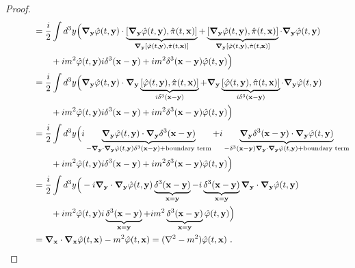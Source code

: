\begin{proof}
\begin{equation*}
\begin{aligned}
            \phantom{\pdv{}{t} \hat \pi (x)} & = \frac{i}{2} \int d^3 y \Big (\boldsymbol \nabla_{\mathbf y} \hat \varphi (t, \mathbf y) \cdot \underbrace{[\boldsymbol \nabla_{\mathbf y} \hat \varphi (t, \mathbf y), \hat \pi (t, \mathbf x)]}_{\boldsymbol \nabla_{\mathbf y} [\hat \varphi (t, \mathbf y), \hat \pi (t, \mathbf x)]} + \underbrace{[\boldsymbol \nabla_{\mathbf y} \hat \varphi (t, \mathbf y), \hat \pi (t, \mathbf x)]}_{\boldsymbol \nabla_{\mathbf y} [\hat \varphi (t, \mathbf y), \hat \pi (t, \mathbf x)]} \cdot \boldsymbol \nabla_{\mathbf y} \hat \varphi (t, \mathbf y) \\ & \qquad + i m^2 \hat \varphi (t, \mathbf y) i \delta^3 (\mathbf x - \mathbf y) + i m^2 \delta^3 (\mathbf x - \mathbf y) \hat \varphi (t, \mathbf y) \Big ) \\ & = \frac{i}{2} \int d^3 y \Big (\boldsymbol \nabla_{\mathbf y} \hat \varphi (t, \mathbf y) \cdot \boldsymbol \nabla_{\mathbf y} \underbrace{[\hat \varphi (t, \mathbf y), \hat \pi (t, \mathbf x)]}_{i \delta^3 (\mathbf x - \mathbf y)} + \boldsymbol \nabla_{\mathbf y} \underbrace{[\hat \varphi (t, \mathbf y), \hat \pi (t, \mathbf x)]}_{i \delta^3 (\mathbf x - \mathbf y)} \cdot \boldsymbol \nabla_{\mathbf y} \hat \varphi (t, \mathbf y) \\ & \qquad + i m^2 \hat \varphi (t, \mathbf y) i \delta^3 (\mathbf x - \mathbf y) + i m^2 \delta^3 (\mathbf x - \mathbf y) \hat \varphi (t, \mathbf y) \Big ) \\ & = \frac{i}{2} \int d^3 y \Big (i \underbrace{\boldsymbol \nabla_{\mathbf y} \hat \varphi (t, \mathbf y) \cdot \boldsymbol \nabla_{\mathbf y} \delta^3 (\mathbf x - \mathbf y)}_{- \boldsymbol \nabla_{\mathbf y} \cdot \boldsymbol \nabla_{\mathbf y} \hat \varphi (t, \mathbf y) \delta^3 (\mathbf x - \mathbf y) + \textnormal{boundary term}} + i \underbrace{\boldsymbol \nabla_{\mathbf y} \delta^3 (\mathbf x - \mathbf y) \cdot \boldsymbol \nabla_{\mathbf y} \hat \varphi (t, \mathbf y)}_{- \delta^3 (\mathbf x - \mathbf y) \boldsymbol \nabla_{\mathbf y} \cdot \boldsymbol \nabla_{\mathbf y} \hat \varphi (t, \mathbf y) + \textnormal{boundary term}} \\ & \qquad + i m^2 \hat \varphi (t, \mathbf y) i \delta^3 (\mathbf x - \mathbf y) + i m^2 \delta^3 (\mathbf x - \mathbf y) \hat \varphi (t, \mathbf y) \Big ) \\ & = \frac{i}{2} \int d^3 y \Big (- i \boldsymbol \nabla_{\mathbf y} \cdot \boldsymbol \nabla_{\mathbf y} \hat \varphi (t, \mathbf y) \underbrace{\delta^3 (\mathbf x - \mathbf y) }_{\mathbf x = \mathbf y} - i \underbrace{\delta^3 (\mathbf x - \mathbf y) }_{\mathbf x = \mathbf y} \boldsymbol \nabla_{\mathbf y} \cdot \boldsymbol \nabla_{\mathbf y} \hat \varphi (t, \mathbf y) \\ & \qquad + i m^2 \hat \varphi (t, \mathbf y) i \underbrace{\delta^3 (\mathbf x - \mathbf y) }_{\mathbf x = \mathbf y} + i m^2 \underbrace{\delta^3 (\mathbf x - \mathbf y) }_{\mathbf x = \mathbf y} \hat \varphi (t, \mathbf y) \Big ) \\ & = \boldsymbol \nabla_{\mathbf x} \cdot \boldsymbol \nabla_{\mathbf x} \hat \varphi (t, \mathbf x) - m^2 \hat \varphi (t, \mathbf x) = (\nabla^2 - m^2) \hat \varphi (t, \mathbf x) ~.

\end{aligned}
\end{equation*}
\end{proof}
